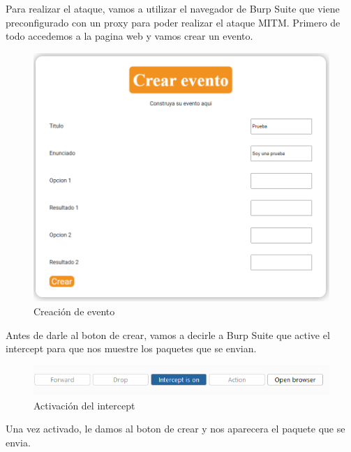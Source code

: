\documentclass{report}
\begin{document}
                Para realizar el ataque, vamos a utilizar el navegador de Burp Suite que viene preconfigurado con un proxy para poder realizar el ataque MITM.
                Primero de todo accedemos a la pagina web y vamos crear un evento.
                \begin{figure}[H]
                    \centering
                    \includegraphics[width=1\textwidth]{./img/vulnerabilidades/2.2/2.1.png}
                    \caption{Creación de evento}
                \end{figure}
                \clearpage
                Antes de darle al boton de crear, vamos a decirle a Burp Suite que active el intercept para que nos muestre los paquetes que se envian.
                \begin{figure}[H]
                    \centering
                    \includegraphics[width=1\textwidth]{./img/vulnerabilidades/2.2/2.2.png}
                    \caption{Activación del intercept}
                \end{figure}
                Una vez activado, le damos al boton de crear y nos aparecera el paquete que se envia.
\end{document}
